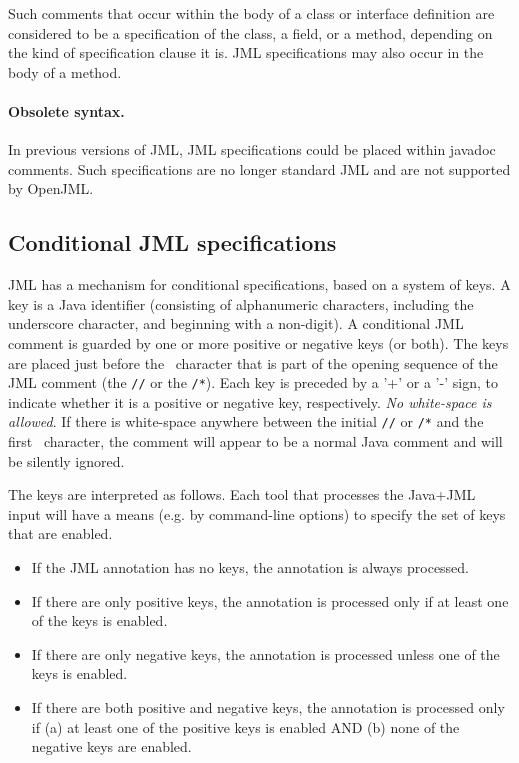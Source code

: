 Such comments that occur within the body of a class or interface definition are
considered to be a specification of the class, a field, or a method, depending on the
kind of specification clause it is. JML specifications may also occur in the body of 
a method.

\paragraph{Obsolete syntax.} In previous versions of JML, JML specifications could be placed
within javadoc comments. Such specifications are no longer standard JML and are not supported by OpenJML.

\subsection{Conditional JML specifications}

JML has a mechanism for conditional specifications, based on a system of keys.
A key is a Java identifier (consisting of alphanumeric characters, including the underscore character, and beginning with a non-digit).
A conditional JML comment is guarded by one or more positive or negative keys (or both).
The keys are placed just before the \at~character that is part of the opening sequence of the JML comment
(the {\tt //\at} or the {\tt /*\at}). Each key is preceded by a '+' or a '-' sign, to indicate whether it is a positive
or negative key, respectively. {\it No white-space is allowed}. If there is white-space anywhere between the
initial {\tt //} or {\tt /*} and the first \at~character, the comment will appear to be a normal Java comment and will be
silently ignored.

The keys are interpreted as follows. Each tool that processes the Java+JML input will have a means
(e.g. by command-line options) to specify the set of keys that are enabled.
\begin{itemize}
\item If the JML annotation has no keys, the annotation is always processed.
\item If there are only positive keys, the annotation is processed only if at least one of the keys is enabled.
\item If there are only negative keys, the annotation is processed unless one of the keys is enabled.
\item If there are both positive and negative keys, the annotation is processed only if (a) at least one of the
positive keys is enabled AND (b) none of the negative keys are enabled.
\end{itemize}

